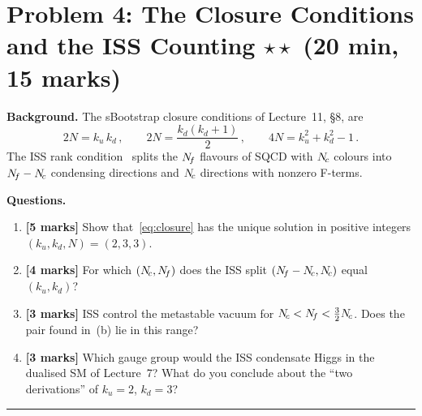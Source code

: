 \documentclass[11pt,a4paper]{article}
\begin{document}
\bigskip

\section*{Problem 4: The Closure Conditions and the ISS Counting
  \hfill $\star\star$ \normalsize(20 min, 15 marks)}
\label{prob:closure}

\noindent\textbf{Background.}
The sBootstrap closure conditions of Lecture~11, \S8, are
\begin{equation}\label{eq:closure}
  2N = k_u\,k_d\,,\qquad
  2N = \frac{k_d(k_d+1)}{2}\,,\qquad
  4N = k_u^2 + k_d^2 - 1\,.
\end{equation}
The ISS rank condition~\cite{ISS2006} splits the $N_{\!f}$ flavours of
SQCD with $N_{\!c}$ colours into $N_{\!f}-N_{\!c}$ condensing directions and $N_{\!c}$
directions with nonzero F-terms.

\medskip

\noindent\textbf{Questions.}
\begin{enumerate}[label=(\alph*)]
  \item \textbf{[5 marks]}
    Show that~\eqref{eq:closure} has the unique solution in positive
    integers $(k_u,k_d,N) = (2,3,3)$.
  \item \textbf{[4 marks]}
    For which $(N_{\!c},N_{\!f})$ does the ISS split
    $(N_{\!f}-N_{\!c},N_{\!c})$ equal $(k_u,k_d)$?
  \item \textbf{[3 marks]}
    ISS control the metastable vacuum for $N_{\!c} < N_{\!f} < \tfrac32N_{\!c}$.
    Does the pair found in~(b) lie in this range?
  \item \textbf{[3 marks]}
    Which gauge group would the ISS condensate Higgs in the dualised SM
    of Lecture~7?  What do you conclude about the ``two derivations''
    of $k_u = 2$, $k_d = 3$?
\end{enumerate}


\bigskip
\hrule
\bigskip
\end{document}
